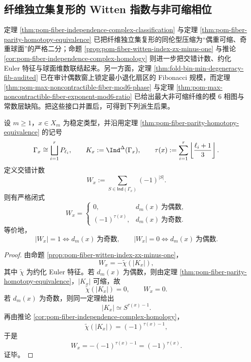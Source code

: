 \subsection{纤维独立集复形的 Witten 指数与非可缩相位}

定理 \ref{thm:pom-fiber-independence-complex-classification} 与定理 \ref{thm:pom-fiber-parity-homotopy-equivalence} 已把纤维独立集复形的同伦型压缩为“偶重可缩、奇重球面”的严格二分；命题 \ref{prop:pom-fiber-witten-index-zx-minus-one} 与推论 \ref{cor:pom-fiber-independence-complex-homology} 则进一步把交错计数、约化 Euler 特征与球面维数联结起来。另一方面，定理 \ref{thm:fold-bin-min-degeneracy-fib-audited} 已在审计偶数窗上锁定最小退化扇区的 Fibonacci 规模，而定理 \ref{thm:pom-max-noncontractible-fiber-mod6-phase} 与定理 \ref{thm:pom-max-noncontractible-fiber-exponent-mod6-ratio} 已给出最大非可缩纤维的模 \(6\) 相图与常数层缺陷。把这些接口并置后，可得到下列派生后果。

\begin{theorem}\label{thm:derived-fiber-indcomplex-alternating-witten-parity}
设 \(m\ge 1\)，\(x\in X_m\) 为稳定类型，并沿用定理 \ref{thm:pom-fiber-parity-homotopy-equivalence} 的记号
\[
\Gamma_x\cong \bigsqcup_{i=1}^{r}P_{\ell_i},
\qquad
K_x:=\Ind^{\Delta}(\Gamma_x),
\qquad
\tau(x):=\sum_{i=1}^{r}\left\lfloor\frac{\ell_i+1}{3}\right\rfloor.
\]
定义交错计数
\[
W_x:=\sum_{S\in \mathsf{Ind}(\Gamma_x)}(-1)^{|S|}.
\]
则有严格闭式
\[
W_x=
\begin{cases}
0, & d_m(x)\ \text{为偶数},\\[4pt]
(-1)^{\tau(x)}, & d_m(x)\ \text{为奇数}.
\end{cases}
\]
等价地，
\[
|W_x|=1\iff d_m(x)\ \text{为奇数},
\qquad
|W_x|=0\iff d_m(x)\ \text{为偶数}.
\]
\end{theorem}
\begin{proof}
由命题 \ref{prop:pom-fiber-witten-index-zx-minus-one}，
\[
W_x=-\widetilde\chi(|K_x|),
\]
其中 \(\widetilde\chi\) 为约化 Euler 特征。若 \(d_m(x)\) 为偶数，则由定理 \ref{thm:pom-fiber-parity-homotopy-equivalence}，\(|K_x|\) 可缩，故
\[
\widetilde\chi(|K_x|)=0,
\qquad
W_x=0.
\]
若 \(d_m(x)\) 为奇数，则同一定理给出
\[
|K_x|\simeq S^{\tau(x)-1}.
\]
再由推论 \ref{cor:pom-fiber-independence-complex-homology}，
\[
\widetilde\chi(|K_x|)=(-1)^{\tau(x)-1},
\]
于是
\[
W_x=-(-1)^{\tau(x)-1}=(-1)^{\tau(x)}.
\]
证毕。
\end{proof}

